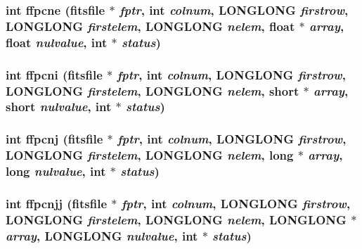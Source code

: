 \subsubsection{\setlength{\rightskip}{0pt plus 5cm}int ffpcne (\bf{fitsfile} $\ast$ {\em fptr}, int {\em colnum}, \bf{LONGLONG} {\em firstrow}, \bf{LONGLONG} {\em firstelem}, \bf{LONGLONG} {\em nelem}, float $\ast$ {\em array}, float {\em nulvalue}, int $\ast$ {\em status})}\label{test_2shm__client_2fitsio_8h_e90f56227753bb7883ba1b42e31a5f00}


\subsubsection{\setlength{\rightskip}{0pt plus 5cm}int ffpcni (\bf{fitsfile} $\ast$ {\em fptr}, int {\em colnum}, \bf{LONGLONG} {\em firstrow}, \bf{LONGLONG} {\em firstelem}, \bf{LONGLONG} {\em nelem}, short $\ast$ {\em array}, short {\em nulvalue}, int $\ast$ {\em status})}\label{test_2shm__client_2fitsio_8h_282b5e2033ea5cfb0c4b5dfaecde95d7}


\subsubsection{\setlength{\rightskip}{0pt plus 5cm}int ffpcnj (\bf{fitsfile} $\ast$ {\em fptr}, int {\em colnum}, \bf{LONGLONG} {\em firstrow}, \bf{LONGLONG} {\em firstelem}, \bf{LONGLONG} {\em nelem}, long $\ast$ {\em array}, long {\em nulvalue}, int $\ast$ {\em status})}\label{test_2shm__client_2fitsio_8h_84de8caa3460cd6bb387c389b9a684d9}


\subsubsection{\setlength{\rightskip}{0pt plus 5cm}int ffpcnjj (\bf{fitsfile} $\ast$ {\em fptr}, int {\em colnum}, \bf{LONGLONG} {\em firstrow}, \bf{LONGLONG} {\em firstelem}, \bf{LONGLONG} {\em nelem}, \bf{LONGLONG} $\ast$ {\em array}, \bf{LONGLONG} {\em nulvalue}, int $\ast$ {\em status})}\label{test_2shm__client_2fitsio_8h_74f7a5525896c9793648df097c2bdcc9}


